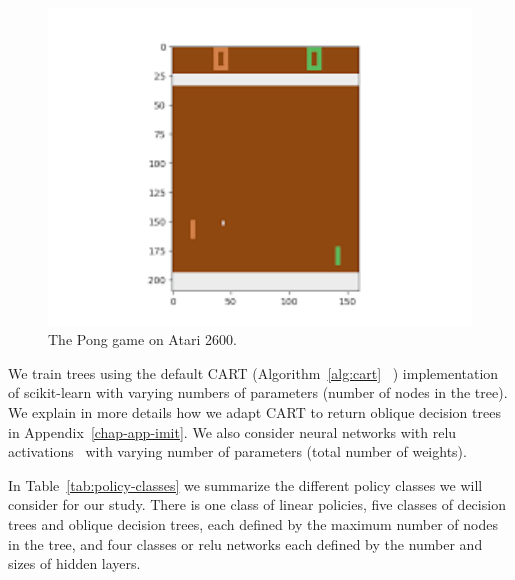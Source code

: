 \begin{figure}
\begin{minipage}{0.47\textwidth}
  \end{minipage}
  \hfill
  \begin{minipage}{0.47\textwidth}
  \includegraphics[width=1\textwidth]{images/images_part3/pong.png}
  \caption{The Pong game on Atari 2600.}\label{lst:generic-linear}
  \end{minipage}
  \end{figure}
We train trees using the default CART (Algorithm~\ref{alg:cart} ~\cite{breiman1984clasification}) implementation of scikit-learn with varying numbers of parameters (number of nodes in the tree).
We explain in more details how we adapt CART to return oblique decision trees in Appendix~\ref{chap-app-imit}.
We also consider neural networks with relu activations~\cite{relunet} with varying number of parameters (total number of weights).

In Table~\ref{tab:policy-classes} we summarize the different policy classes we will consider for our study.
There is one class of linear policies, five classes of decision trees and oblique decision trees, each defined by the maximum number of nodes in the tree, and four classes or relu networks each defined by the number and sizes of hidden layers.

